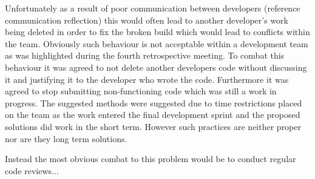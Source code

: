 \documentclass{l3proj}
\begin{document}
Unfortunately as a result of poor communication between developers (reference communication reflection) this would often lead to another developer's work being deleted in order to fix the broken build which would lead to conflicts within the team. Obviously such behaviour is not acceptable within a development team as was highlighted during the fourth retrospective meeting. To combat this behaviour it was agreed to not delete another developers code without discussing it and justifying it to the developer who wrote the code. Furthermore it was agreed to stop submitting non-functioning code which was still a work in progress. The suggested methods were suggested due to time restrictions placed on the team as the work entered the final development sprint and the proposed solutions did work in the short term. However such practices are neither proper nor are they long term solutions. 

Instead the most obvious combat to this problem would be to conduct regular code reviews...
\end{document}

